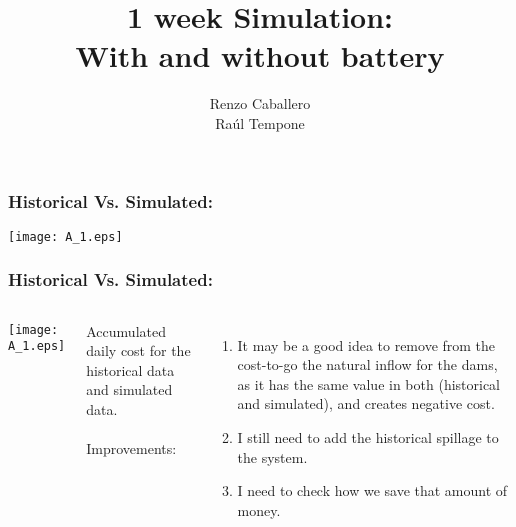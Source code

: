 \documentclass[aspectratio=169]{beamer}\usepackage[utf8]{inputenc}
\title{1 week Simulation:\\
With and without battery}
\subtitle{Renzo Caballero\\
Ra\'ul Tempone}
\begin{document}
\begin{frame}
\titlepage
\end{frame}

\graphicspath{{../../../All/Simulation_1W/}}

\begin{frame}
\frametitle{Historical Vs. Simulated:}

{\texttt{[image: A\_1.eps]}}

\end{frame}

\begin{frame}
\frametitle{Historical Vs. Simulated:}

\begin{columns}[c]

{\texttt{[image: A\_1.eps]}}

Accumulated daily cost for the {\color{blue}historical data} and {\color{orange}simulated data}.\\
\quad\\
Improvements:
\begin{enumerate}

\item It may be a good idea to remove from the cost-to-go the natural inflow for the dams, as it has the same value in both ({\color{blue}historical} and {\color{orange}simulated}), and creates negative cost.

\item I still need to add the historical spillage to the system.

\item I need to check how we save that amount of money.

\end{enumerate}

\end{columns} 

\end{frame}
\end{document}
